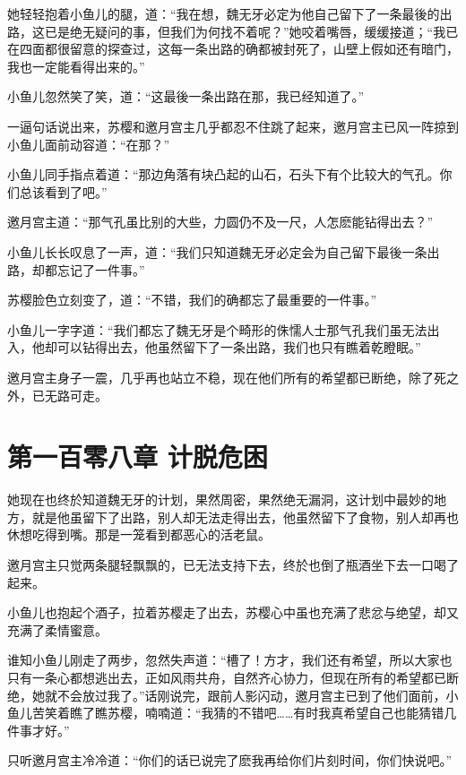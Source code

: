 \documentclass[12pt,oneside]{book}
\begin{document}
她轻轻抱着小鱼儿的腿，道：``我在想，魏无牙必定为他自己留下了一条最後的出路，这已是绝无疑问的事，但我们为何找不着呢？''她咬着嘴唇，缓缓接道；``我已在四面都很留意的探查过，这每一条出路的确都被封死了，山壁上假如还有暗门，我也一定能看得出来的。''

小鱼儿忽然笑了笑，道：``这最後一条出路在那，我已经知道了。''

一逼句话说出来，苏樱和邀月宫主几乎都忍不住跳了起来，邀月宫主已风一阵掠到小鱼儿面前动容道：``在那？''

小鱼儿同手指点着道：``那边角落有块凸起的山石，石头下有个比较大的气孔。你们总该看到了吧。''

邀月宫主道：``那气孔虽比别的大些，力圆仍不及一尺，人怎麽能钻得出去？''

小鱼儿长长叹息了一声，道：``我们只知道魏无牙必定会为自己留下最後一条出路，却都忘记了一件事。''

苏樱脸色立刻变了，道：``不错，我们的确都忘了最重要的一件事。''

小鱼儿一字字道：``我们都忘了魏无牙是个畸形的侏懦人士那气孔我们虽无法出入，他却可以钻得出去，他虽然留下了一条出路，我们也只有瞧着乾瞪眠。''

邀月宫主身子一震，几乎再也站立不稳，现在他们所有的希望都已断绝，除了死之外，已无路可走。

\hypertarget{ux7b2cux4e00ux767eux96f6ux516bux7ae0-ux8ba1ux8131ux5371ux56f0}{%
\chapter{第一百零八章
计脱危困}\label{ux7b2cux4e00ux767eux96f6ux516bux7ae0-ux8ba1ux8131ux5371ux56f0}}

她现在也终於知道魏无牙的计划，果然周密，果然绝无漏洞，这计划中最妙的地方，就是他虽留下了出路，别人却无法走得出去，他虽然留下了食物，别人却再也休想吃得到嘴。那是一笼看到都恶心的活老鼠。

邀月宫主只觉两条腿轻飘飘的，已无法支持下去，终於也倒了瓶酒坐下去一口喝了起来。

小鱼儿也抱起个酒子，拉着苏樱走了出去，苏樱心中虽也充满了悲忿与绝望，却又充满了柔情蜜意。

谁知小鱼儿刚走了两步，忽然失声道：``槽了！方才，我们还有希望，所以大家也只有一条心都想逃出去，正如风雨共舟，自然齐心协力，但现在所有的希望都已断绝，她就不会放过我了。''话刚说完，跟前人影闪动，邀月宫主已到了他们面前，小鱼儿苦笑着瞧了瞧苏樱，喃喃道：``我猜的不错吧\ldots\ldots 有时我真希望自己也能猜错几件事才好。''

只听邀月宫主冷冷道：``你们的话已说完了麽我再给你们片刻时间，你们快说吧。''
\end{document}
